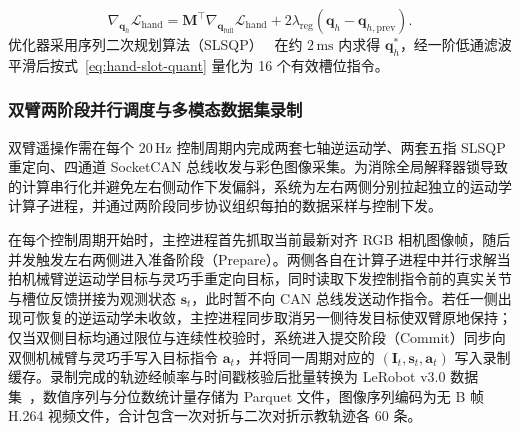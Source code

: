\begin{equation}
  \nabla_{\bm{q}_h}\mathcal{L}_{\text{hand}} = \bm{M}^{\top} \nabla_{\bm{q}_{\text{full}}}\mathcal{L}_{\text{hand}} + 2\lambda_{\text{reg}}(\bm{q}_h - \bm{q}_{h,\text{prev}}).
  \label{eq:mimic-grad-pullback}
\end{equation}
优化器采用序列二次规划算法（SLSQP）~\cite{kraft1988software} 在约 $2\,\mathrm{ms}$ 内求得 $\bm{q}_h^*$，经一阶低通滤波平滑后按式~\eqref{eq:hand-slot-quant} 量化为 16 个有效槽位指令。

\subsubsection{双臂两阶段并行调度与多模态数据集录制}

双臂遥操作需在每个 $20\,\mathrm{Hz}$ 控制周期内完成两套七轴逆运动学、两套五指 SLSQP 重定向、四通道 SocketCAN 总线收发与彩色图像采集。为消除全局解释器锁导致的计算串行化并避免左右侧动作下发偏斜，系统为左右两侧分别拉起独立的运动学计算子进程，并通过两阶段同步协议组织每拍的数据采样与控制下发。

在每个控制周期开始时，主控进程首先抓取当前最新对齐 RGB 相机图像帧，随后并发触发左右两侧进入准备阶段（Prepare）。两侧各自在计算子进程中并行求解当拍机械臂逆运动学目标与灵巧手重定向目标，同时读取下发控制指令前的真实关节与槽位反馈拼接为观测状态 $\bm{s}_t$，此时暂不向 CAN 总线发送动作指令。若任一侧出现可恢复的逆运动学未收敛，主控进程同步取消另一侧待发目标使双臂原地保持；仅当双侧目标均通过限位与连续性校验时，系统进入提交阶段（Commit）同步向双侧机械臂与灵巧手写入目标指令 $\bm{a}_t$，并将同一周期对应的 $(\bm{I}_t, \bm{s}_t, \bm{a}_t)$ 写入录制缓存。录制完成的轨迹经帧率与时间戳核验后批量转换为 LeRobot v3.0 数据集~\cite{cadene2026lerobot}，数值序列与分位数统计量存储为 Parquet 文件，图像序列编码为无 B 帧 H.264 视频文件，合计包含一次对折与二次对折示教轨迹各 60 条。
